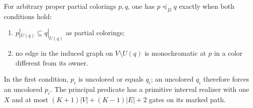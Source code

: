 \begin{theorem}
\label{core:thm:graph-activation-order}
For arbitrary proper partial colorings $p,q$, one has
$p\preceq_Dq$ exactly when both conditions hold:
\begin{enumerate}
\item $p|_{U(q)}\subseteq q|_{U(q)}$ as partial colorings;
\item no edge in the induced graph on $V\setminus U(q)$ is
  monochromatic at $p$ in a color different from its owner.
\end{enumerate}
In the first condition, $p_i$ is uncolored or equals $q_i$;
an uncolored $q_i$ therefore forces an uncolored $p_i$.
The principal predicate has a primitive interval realizer with one
$X$ and at most $(K+1)|V|+(K-1)|E|+2$ gates on its marked path.
\end{theorem}
